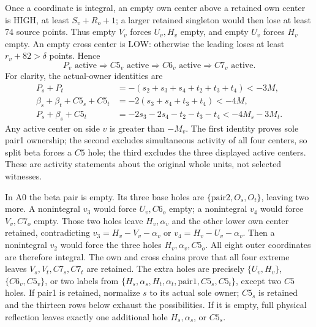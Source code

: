 \documentclass[11pt,letterpaper]{article}
\theoremstyle{definition}\newtheorem{definition}[theorem]{Definition}
\begin{document}
Once a coordinate is integral, an empty own center above a retained own
center is HIGH, at least $S_v+R_o+1$; a larger retained singleton would
then lose at least 74 source points. Thus empty $V_v$ forces $U_v,H_v$
empty, and empty $U_v$ forces $H_v$ empty. An empty cross center is LOW:
otherwise the leading loses at least $r_v+82>\delta$ points. Hence
\begin{equation}\label{eq:z5-crosschain}
 P_v\text{ active}\Longrightarrow C5_v\text{ active}
 \Longrightarrow C6_v\text{ active}\Longrightarrow C7_v\text{ active}.
\end{equation}
For clarity, the actual-owner identities are
\[
\begin{split}
 P_s+P_t&=-(s_2+s_3+s_4+t_2+t_3+t_4)<-3M,\\
 \beta_s+\beta_t+C5_s+C5_t&=-2(s_3+s_4+t_3+t_4)<-4M,\\
 P_s+\beta_s+C5_t&=-2s_3-2s_4-t_2-t_3-t_4<-4M_s-3M_t.
\end{split}
\]
Any active center on side $v$ is greater than $-M_v$. The first
identity proves sole pair1 ownership; the second excludes simultaneous
activity of all four centers, so split beta forces a $C5$ hole; the
third excludes the three displayed active centers. These are activity
statements about the original whole units, not selected witnesses.

In A0 the beta pair is empty. Its three base holes are
$\{\mathrm{pair2},O_s,O_t\}$, leaving two more. A nonintegral $v_3$
would force $U_v,C6_o$ empty; a nonintegral $v_4$ would force
$V_v,C7_o$ empty. Those two holes leave $H_v,\alpha_v$ and the other
lower own center retained, contradicting
$v_3=H_v-V_v-\alpha_v$ or $v_4=H_v-U_v-\alpha_v$.
Then a nonintegral $v_2$ would force the three holes
$H_v,\alpha_v,C5_o$. All eight outer coordinates are therefore integral.
The own and cross chains prove that all four extreme leaves
$V_s,V_t,C7_s,C7_t$ are retained. The extra holes are precisely
$\{U_v,H_v\}$, $\{C6_v,C5_v\}$, or two labels from
$\{H_s,\alpha_s,H_t,\alpha_t,\mathrm{pair1},C5_s,C5_t\}$,
except two $C5$ holes. If pair1 is retained, normalize $s$ to its actual
sole owner; $C5_s$ is retained and the thirteen rows below exhaust the
possibilities. If it is empty, full physical reflection leaves exactly
one additional hole $H_s,\alpha_s$, or $C5_s$.
\end{document}

